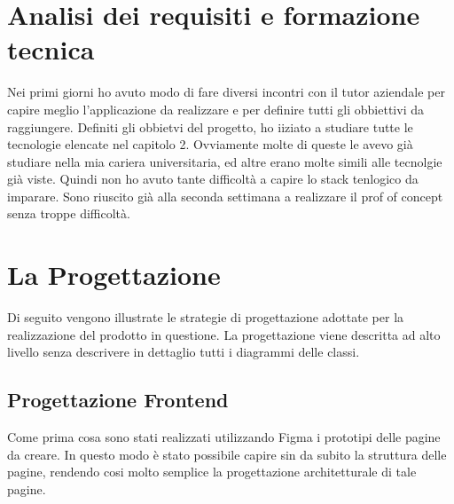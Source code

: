 \section{Analisi dei requisiti e formazione tecnica}
Nei primi giorni ho avuto modo di fare diversi incontri con il tutor aziendale per capire meglio l'applicazione da realizzare e per definire tutti gli obbiettivi da raggiungere. 
Definiti gli obbietvi del progetto, ho iiziato a studiare tutte le tecnologie elencate nel capitolo 2. Ovviamente molte di queste le avevo già studiare nella mia cariera universitaria, ed altre erano molte simili alle tecnolgie già viste. Quindi non ho avuto tante difficoltà a capire lo stack tenlogico da imparare.
 Sono riuscito già alla seconda settimana a realizzare il prof of concept senza troppe difficoltà.  
\section{La Progettazione}

Di seguito vengono illustrate le strategie di progettazione adottate per la realizzazione del prodotto in questione. La progettazione viene descritta ad alto livello senza descrivere in dettaglio tutti i diagrammi delle classi.
\subsection{Progettazione Frontend}
\label{sec:progettazione}
Come prima cosa sono stati realizzati utilizzando Figma i prototipi delle pagine da creare. In questo modo è stato possibile capire sin da subito la struttura delle pagine, rendendo cosi molto semplice la progettazione architetturale di tale pagine.
